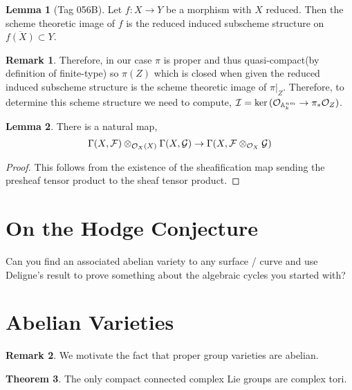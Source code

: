 \documentclass[12pt]{extarticle}
\theoremstyle{definition}
\newtheorem{theorem}{Theorem}[section]
\newtheorem{lemma}[theorem]{Lemma}
\newtheorem{remark}{Remark}
\newcommand{\F}{\mathcal{F}}
\newcommand{\G}{\mathcal{G}}
\newcommand{\A}{\mathbb{A}}
\begin{document}
\begin{lemma}[Tag 056B]
Let $f : X \to Y$ be a morphism with $X$ reduced. Then the scheme theoretic image of $f$ is the reduced induced subscheme structure on $\overline{f(X)} \subset Y$.
\end{lemma}

\begin{remark}
Therefore, in our case $\pi$ is proper and thus quasi-compact(by definition of finite-type) so $\pi(Z)$ which is closed when given the reduced induced subscheme structure is the scheme theoretic image of $\pi|_Z$. Therefore, to determine this scheme structure we need to compute, $\I = \ker{(\struct{\A^{nm}_k} \to \pi_* \struct{Z})}$.  
\end{remark}

\begin{lemma}
There is a natural map,
\[ \Gamma(X, \F) \otimes_{\struct{X}(X)} \Gamma(X, \G) \to \Gamma(X, \F \otimes_{\struct{X}} \G)  \] 
\end{lemma}

\begin{proof}
This follows from the existence of the sheafification map sending the presheaf tensor product to the sheaf tensor product.
\end{proof}

\section{On the Hodge Conjecture}

Can you find an associated abelian variety to any surface / curve and use Deligne's result to prove something about the algebraic cycles you started with?


\section{Abelian Varieties}

\begin{remark}
We motivate the fact that proper group varieties are abelian.
\end{remark}

\begin{theorem}
The only compact connected complex Lie groups are complex tori.
\end{theorem}
\end{document}
